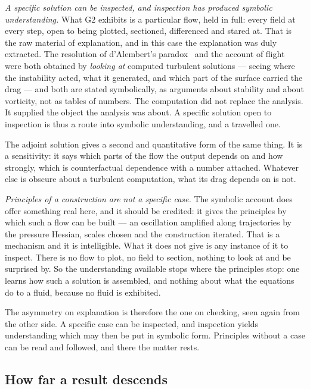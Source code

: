 \documentclass[11pt]{article}
\begin{document}
\emph{A specific solution can be inspected, and inspection has produced symbolic understanding.} What
G2 exhibits is a particular flow, held in full: every field at every step, open to being plotted,
sectioned, differenced and stared at. That is the raw material of explanation, and in this case the
explanation was duly extracted. The resolution of d'Alembert's paradox~\cite{dalembert} and the
account of flight~\cite{flight} were both obtained by \emph{looking at} computed turbulent solutions
--- seeing where the instability acted, what it generated, and which part of the surface carried the
drag --- and both are stated symbolically, as arguments about stability and about vorticity, not as
tables of numbers. The computation did not replace the analysis. It supplied the object the analysis
was about. A specific solution open to inspection is thus a route into symbolic understanding, and a
travelled one.

The adjoint solution gives a second and quantitative form of the same thing. It is a sensitivity: it
says which parts of the flow the output depends on and how strongly, which is counterfactual
dependence with a number attached. Whatever else is obscure about a turbulent computation, what its
drag depends on is not.

\emph{Principles of a construction are not a specific case.} The symbolic account does offer
something real here, and it should be credited: it gives the principles by which such a flow can be
built --- an oscillation amplified along trajectories by the pressure Hessian, scales chosen and the
construction iterated. That is a mechanism and it is intelligible. What it does not give is any
instance of it to inspect. There is no flow to plot, no field to section, nothing to look at and be
surprised by. So the understanding available stops where the principles stop: one learns how such a
solution is assembled, and nothing about what the equations do to a fluid, because no fluid is
exhibited.

The asymmetry on explanation is therefore the one on checking, seen again from the other side. A
specific case can be inspected, and inspection yields understanding which may then be put in symbolic
form. Principles without a case can be read and followed, and there the matter rests.

\subsection{How far a result descends}\label{sec:ladder}
\end{document}
